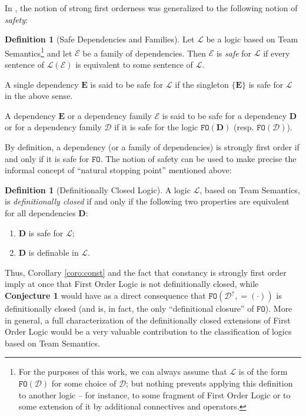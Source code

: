 \documentclass{article}
\theoremstyle{definition}
\newtheorem{Definition}[Theorem]{Definition}
\newcommand{\FO}{\texttt{FO}}
\newcommand{\D}{\mathbf D}
\newcommand{\DD}{\mathcal D}
\newcommand{\E}{\mathbf E}
\newcommand{\EE}{\mathcal E}
\newcommand{\LL}{\mathcal L}
\begin{document}
In \cite{galliani2018safe}, the notion of strong first orderness was generalized to the following notion of \emph{safety}:
\begin{Definition}[Safe Dependencies and Families]
Let $\LL$ be a logic based on Team Semantics\footnote{For the purposes of this work, we can always assume that $\LL$ is of the form $\FO(\DD)$ for some choice of $\DD$; but nothing prevents applying this definition to another logic -- for instance, to some fragment of First Order Logic or to some extension of it by additional connectives and operators.} and let $\EE$ be a family of dependencies. Then $\EE$ is \emph{safe} for $\LL$ if every sentence of $\LL(\EE)$ is equivalent to some sentence of $\LL$.  

A single dependency $\E$ is said to be safe for $\LL$ if the singleton $\{\E\}$ is safe for $\LL$ in the above sense. 

A dependency $\E$ or a dependency family $\EE$ is said to be safe for a dependency $\D$ or for a dependency family $\DD$ if it is safe for the logic $\FO(\D)$ (resp. $\FO(\DD)$). 
\end{Definition}
By definition, a dependency (or a family of dependencies) is strongly first order if and only if it is safe for $\FO$.  The notion of safety can be used to make precise the informal concept of ``natural stopping point'' mentioned above:
\begin{Definition}[Definitionally Closed Logic]
A logic $\LL$, based on Team Semantics, is \emph{definitionally closed} if and only if the following two properties are equivalent for all dependencies $\D$: 
\begin{enumerate}
\item $\D$ is safe for $\LL$; 
\item $\D$ is definable in $\LL$. 
\end{enumerate}
\end{Definition}

Thus, Corollary \ref{coro:const} and the fact that constancy is strongly first order imply at once that First Order Logic is not definitionally closed, while \textbf{Conjecture 1} would have as a direct consequence that $\FO(\DD^\uparrow, =\!\!(\cdot))$ is definitionally closed (and is, in fact, the only ``definitional closure'' of $\FO$). More in general, a full characterization of the definitionally closed extensions of First Order Logic would be a very valuable contribution to the classification of logics based on Team Semantics. 
\end{document}

